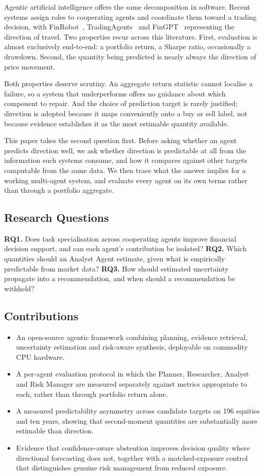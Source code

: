 \documentclass[conference]{IEEEtran}
\begin{document}
Agentic artificial intelligence offers the same decomposition in software.
Recent systems assign roles to cooperating agents and coordinate them toward
a trading decision, with FinRobot~\cite{yang2024finrobot},
TradingAgents~\cite{xiao2024tradingagents} and FinGPT~\cite{yang2023fingpt}
representing the direction of travel. Two properties recur across this
literature. First, evaluation is almost exclusively end-to-end: a portfolio
return, a Sharpe ratio, occasionally a drawdown. Second, the quantity being
predicted is nearly always the direction of price movement.

Both properties deserve scrutiny. An aggregate return statistic cannot
localise a failure, so a system that underperforms offers no guidance about
which component to repair. And the choice of prediction target is rarely
justified; direction is adopted because it maps conveniently onto a buy or
sell label, not because evidence establishes it as the most estimable
quantity available.

This paper takes the second question first. Before asking whether an agent
predicts direction well, we ask whether direction is predictable at all from
the information such systems consume, and how it compares against other
targets computable from the same data. We then trace what the answer implies
for a working multi-agent system, and evaluate every agent on its own terms
rather than through a portfolio aggregate.

\subsection{Research Questions}
\textbf{RQ1.} Does task specialisation across cooperating agents improve
financial decision support, and can each agent's contribution be isolated?
\textbf{RQ2.} Which quantities should an Analyst Agent estimate, given what
is empirically predictable from market data?
\textbf{RQ3.} How should estimated uncertainty propagate into a
recommendation, and when should a recommendation be withheld?

\subsection{Contributions}
\begin{itemize}
\item An open-source agentic framework combining planning, evidence
retrieval, uncertainty estimation and risk-aware synthesis, deployable on
commodity CPU hardware.
\item A per-agent evaluation protocol in which the Planner, Researcher,
Analyst and Risk Manager are measured separately against metrics appropriate
to each, rather than through portfolio return alone.
\item A measured predictability asymmetry across candidate targets on 196
equities and ten years, showing that second-moment quantities are
substantially more estimable than direction.
\item Evidence that confidence-aware abstention improves decision quality
where directional forecasting does not, together with a matched-exposure
control that distinguishes genuine risk management from reduced exposure.
\end{itemize}
\end{document}
